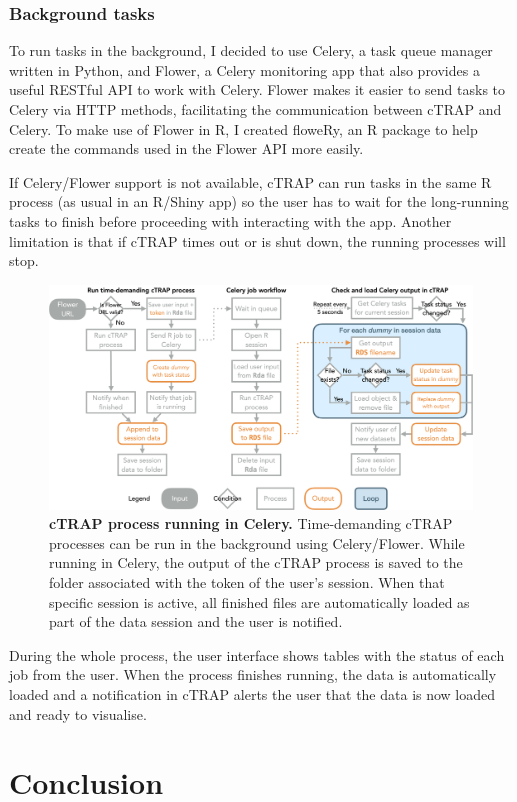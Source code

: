 \subsubsection{Background tasks}


To run tasks in the background, I decided to use Celery, a task queue manager written in Python, and Flower, a Celery monitoring app that also provides a useful RESTful API to work with Celery. Flower makes it easier to send tasks to Celery via HTTP methods, facilitating the communication between cTRAP and Celery. To make use of Flower in R, I created floweRy, an R package to help create the commands used in the Flower API more easily.

If Celery/Flower support is not available, cTRAP can run tasks in the same R process (as usual in an R/Shiny app) so the user has to wait for the long-running tasks to finish before proceeding with interacting with the app. Another limitation is that if cTRAP times out or is shut down, the running processes will stop.

\begin{figure}[!ht]
  \includegraphics[width=\textwidth]{images/ctrap/celery-job}
  \centering
  \caption[cTRAP process running in Celery]{\textbf{cTRAP process running in Celery.} Time-demanding cTRAP processes can be run in the background using Celery/Flower. While running in Celery, the output of the cTRAP process is saved to the folder associated with the token of the user's session. When that specific session is active, all finished files are automatically loaded as part of the data session and the user is notified.}
\end{figure}

During the whole process, the user interface shows tables with the status of each job from the user. When the process finishes running, the data is automatically loaded and a notification in cTRAP alerts the user that the data is now loaded and ready to visualise.

\section{Conclusion}

